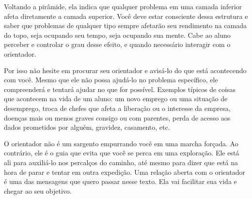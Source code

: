 Voltando a pirâmide, ela indica que qualquer problema em uma camada inferior afeta diretamente a camada superior. Você deve estar consciente dessa estrutura e saber que problemas de qualquer tipo sempre afetarão seu rendimento na camada do topo, seja ocupando seu tempo, seja ocupando sua mente. Cabe ao aluno perceber e controlar o grau desse efeito, e quando necessário interagir com o orientador.

Por isso não hesite em procurar seu orientador e avisá-lo do que está acontecendo com você. Mesmo que ele não possa ajudá-lo no problema específico, ele compreenderá e tentará ajudar no que for possível. 
Exemplos típicos de coisas que acontecem na vida de um aluno: um novo emprego ou uma situação de desemprego, troca de chefes que afeta a liberação ou o interesse da empresa, doenças mais ou menos graves consigo ou com parentes, perda de acesso aos dados prometidos por alguém, gravidez, casamento, etc.

O orientador não é um sargento empurrando você em uma marcha forçada. Ao contrário, ele é o guia que evita que você se perca em uma exploração. Ele está ali para auxiliá-lo nos percalços do caminho, até mesmo para dizer que está na hora de parar e tentar em outra expedição. 
Uma relação aberta com o orientador é uma das mensagens que quero passar nesse texto. Ela vai facilitar sua vida e chegar ao seu objetivo.
